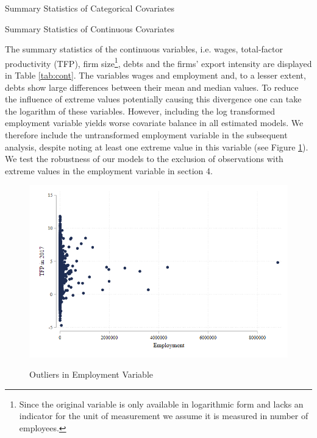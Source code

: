 \documentclass[a4paper,11pt]{scrartcl}
\begin{document}
\begin{table}[h!]
	\centering
	\caption{Summary Statistics of Categorical Covariates} 
	
	\label{tab:cat}	
\end{table} 
\FloatBarrier
\vspace{2em}
\begin{table}[h!]
	\centering
	\caption{Summary Statistics of Continuous Covariates} 
	
	\label{tab:cont}
\end{table}
\FloatBarrier
\newpage

The summary statistics of the continuous variables, i.e. wages,  total-factor productivity (TFP), firm size\footnote{Since the original variable is only available in logarithmic form and lacks an indicator for the unit of measurement we assume it is measured in number of employees.}, debts and the firms' export intensity are displayed in Table \ref{tab:cont}. The variables wages and employment  and, to a lesser extent, debts show large differences between their mean and median values. To reduce the influence of extreme values potentially causing this divergence one can take the logarithm of these variables. However, including the log transformed employment variable yields worse covariate balance in all estimated models. We therefore include the untransformed employment variable in the subsequent analysis, despite noting at least one extreme value in this variable (see Figure \ref{fig:outliers}). We test the robustness of our models to the exclusion of observations with extreme values in the employment variable in section 4.


\begin{figure}[h!]\centering
	\caption{Outliers in Employment Variable}
	\includegraphics[width=\textwidth]{emp15_outliers}
  	\label{fig:outliers}
\end{figure} 
\newpage
\end{document}
